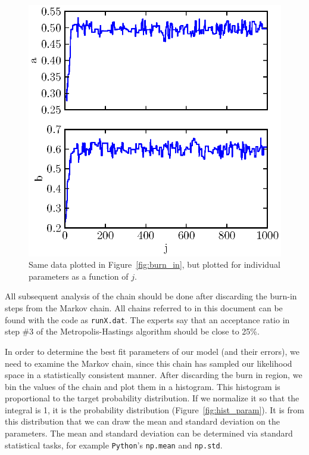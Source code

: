 \documentclass[iop,floatfix]{emulateapj}
\begin{document}
\begin{figure}
\begin{center}
  \includegraphics{param_vs_j}
  \caption{Same data plotted in Figure~\ref{fig:burn_in}, but plotted for individual parameters as a function of $j$.}
\label{fig:param_vs_j}
\end{center}
\end{figure}

All subsequent analysis of the chain should be done after discarding the burn-in steps from the Markov chain. All chains referred to in this document can be found with the code as \verb|runX.dat|. The experts say that an acceptance ratio in step \#3 of the Metropolis-Hastings algorithm should be close to 25\%.

In order to determine the best fit parameters of our model (and their errors), we need to examine the Markov chain, since this chain has sampled our likelihood space in a statistically consistent manner. After discarding the burn in region, we bin the values of the chain and plot them in a histogram. This histogram is proportional to the target probability distribution. If we normalize it so that the integral is 1, it is the probability distribution (Figure~\ref{fig:hist_param}). It is from this distribution that we can draw the mean and standard deviation on the parameters. The mean and standard deviation can be determined via standard statistical tasks, for example \verb|Python|'s \verb|np.mean| and \verb|np.std|.
\end{document}

